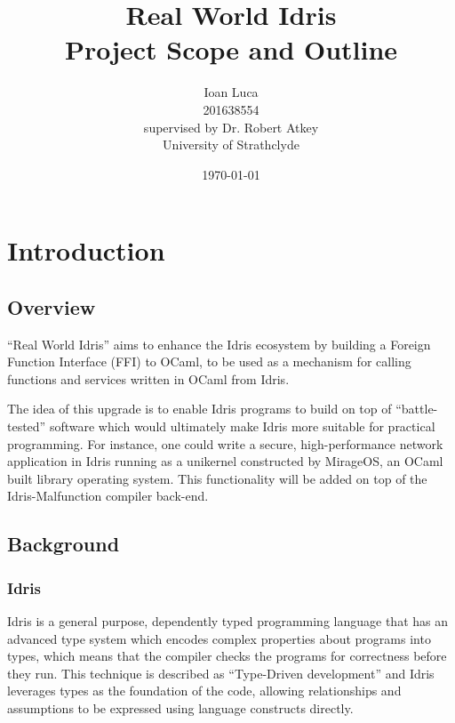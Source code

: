 \documentclass[a4paper]{report}
\begin{document}
\title{Real World Idris \\ Project Scope and Outline}
\author{Ioan Luca \\ 201638554 \\ \small supervised by Dr. Robert Atkey \\
	\small University of Strathclyde} %
\date{\today}
\maketitle


\tableofcontents




\chapter{Introduction}

\section{Overview}

``Real World Idris'' aims to enhance the Idris ecosystem by building a Foreign
Function Interface (FFI) to OCaml, to be used as a mechanism for calling
functions and services written in OCaml from Idris.

The idea of this upgrade is to enable Idris programs to build on top of
``battle-tested'' software which would ultimately make Idris more suitable
for practical programming.
For instance, one could write a secure, high-performance network application in Idris running as a unikernel constructed by MirageOS, an OCaml built library
operating system.
This functionality will be added on top of the Idris-Malfunction compiler
back-end.

\section{Background}

\subsection{Idris}
Idris is a general purpose, dependently typed programming language that has an
advanced type system which encodes complex properties about programs into
types, which means that the compiler checks the programs for correctness
before they run.
This technique is described as ``Type-Driven development'' and Idris leverages
types as the foundation of the code, allowing relationships and assumptions to
be expressed using language constructs directly.
\end{document}

